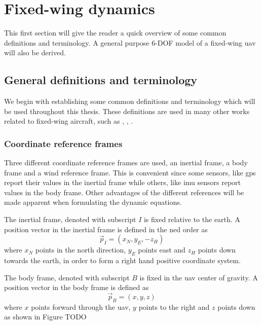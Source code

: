 \section{Fixed-wing dynamics}
This first section will give the reader a quick overview of some common definitions and terminology. 
A general purpose 6-DOF model of a fixed-wing \ac{uav} will also be derived. 
\subsection{General definitions and terminology}
We begin with establishing some common definitions and
 terminology which will be used throughout this thesis. These definitions are 
 used in many other works related to fixed-wing aircraft, such as \cite{uav_dynamics_wind}, \cite{uav_dynamics_modeling}, 
\cite{fighter_aircraft_mpc}. 

\subsubsection{Coordinate reference frames}
Three different coordinate reference frames are used, an inertial frame, a body frame and a wind reference frame.
This is convenient since some sensors, like \ac{gps} report their values in the inertial frame
 while others, like \ac{imu} sensors report values in the body frame. Other advantages of the different references
will be made apparent when formulating the dynamic equations.

\begin{definition}
    The inertial frame, denoted with subscript $I$ is fixed relative to the earth.
    A position vector in the inertial frame is defined in the \ac{ned} order as
    \begin{equation}
        \vec{p}_I = (x_N, y_E, -z_H)
    \end{equation}
    where $x_N$ points in the north direction, $y_E$ points east and $z_H$ points down towards the earth,
    in order to form a right hand positive coordinate system.
\end{definition}

\begin{definition}
    The body frame, denoted with subscript $B$ is fixed in the \ac{uav} center of gravity.
    A position vector in the body frame is defined as
    \begin{equation}
        \vec{p}_B = (x, y, z)
    \end{equation}
    where $x$ points forward through the \ac{uav}, $y$ points to the right and $z$ points down as shown in Figure TODO
\end{definition}

